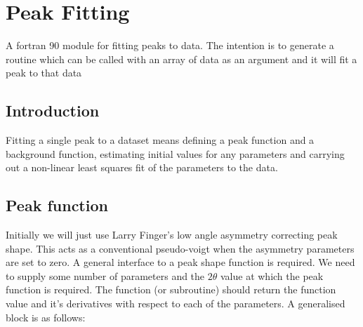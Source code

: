 \documentclass[10pt,a4paper,notitlepage]{article}
\begin{document}
\section{Peak Fitting}
A fortran 90 module for fitting peaks to data. The intention is to
generate a routine which can be called with an array of data as an
argument and it will fit a peak to that data



\subsection{Introduction}

Fitting a single peak to a dataset means defining a peak function and 
a background function, estimating initial values for any parameters
and carrying out a non-linear least squares fit of the parameters to
the data.

\subsection{Peak function}
Initially we will just use Larry Finger's low angle asymmetry correcting
peak shape.
This acts as a conventional pseudo-voigt when the asymmetry parameters
are set to zero.
A general interface to a peak shape function is required. 
We need to supply some number of parameters and the $2\theta$ value at
which the peak function is required. 
The function (or subroutine) should return the function value and it's
derivatives with respect to each of the parameters.
A generalised block is as follows:
\end{document}

